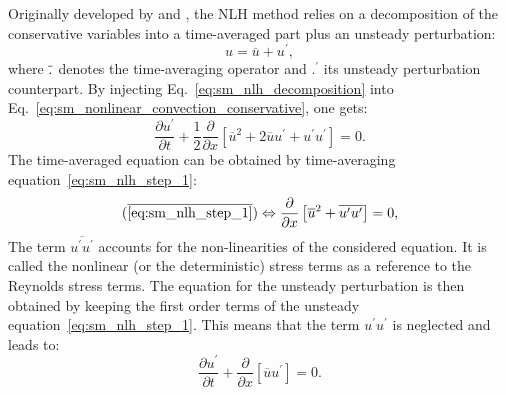 
Originally developed by \citet{He1998} and \citet{Ning1998},
the NLH method
relies on a decomposition of the conservative variables into a
time-averaged part plus an unsteady perturbation:
\begin{equation}
	u = \overline{u} + u^\prime,
	\label{eq:sm_nlh_decomposition}
\end{equation}
where $\overline{\vphantom{u}.}$ denotes the time-averaging operator and
$.^\prime$ its unsteady perturbation counterpart.
By injecting Eq.~\eqref{eq:sm_nlh_decomposition} into
Eq.~\eqref{eq:sm_nonlinear_convection_conservative}, one gets:
\begin{equation}
	\frac{\partial u^\prime}{\partial t} + 
	\frac{1}{2}\frac{\partial}{\partial x} \left[
	\overline{u}^2 + 2 \overline{u} u^\prime + u^\prime u^\prime \right] = 
	0.
	\label{eq:sm_nlh_step_1}
\end{equation}
The time-averaged equation can be obtained by time-averaging
equation~\ref{eq:sm_nlh_step_1}:
\begin{equation}
	(\overline{\ref{eq:sm_nlh_step_1}})
	\Leftrightarrow
	\frac{\partial}{\partial x}
	\left[\overline{u}^2 + 
	\overline{u^\prime u^\prime}\right] =
	0,
	\label{eq:sm_nlh_step_2}
\end{equation}
The term $\overline{u^\prime u^\prime}$
accounts for the non-linearities of the considered equation. It
is called the nonlinear 
(or the deterministic) stress terms as a reference to 
the Reynolds stress terms. 
The equation for the unsteady perturbation is then obtained by keeping
the first order terms of the unsteady equation~\ref{eq:sm_nlh_step_1}.
This means that the term $u^\prime u^\prime$ is neglected and leads
to:
\begin{equation}
	\frac{\partial u^\prime}{\partial t} + 
	\frac{\partial}{\partial x} \left[\overline{u} u^\prime \right] = 
	0.
\end{equation}

